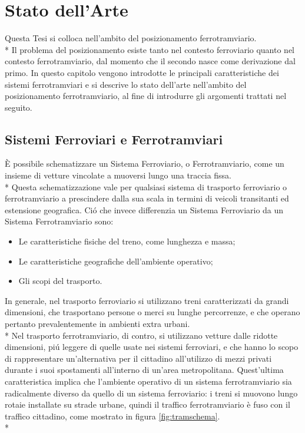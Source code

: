 \chapter{Stato dell'Arte}
Questa Tesi si colloca nell'ambito del posizionamento ferrotramviario.\\*
Il problema del posizionamento esiste tanto nel contesto ferroviario quanto nel contesto ferrotramviario, dal momento che il secondo nasce come derivazione dal primo. In questo capitolo vengono introdotte le principali caratteristiche dei sistemi ferrotramviari e si descrive lo stato dell'arte nell'ambito del posizionamento ferrotramviario, al fine di introdurre gli argomenti trattati nel seguito.
\section{Sistemi Ferroviari e Ferrotramviari}
\`E possibile schematizzare un Sistema Ferroviario, o Ferrotramviario, come un insieme di vetture vincolate a muoversi lungo una traccia fissa.\\*
Questa schematizzazione vale per qualsiasi sistema di trasporto ferroviario o ferrotramviario a prescindere dalla sua scala in termini di veicoli transitanti ed estensione geografica. Ci\'o che invece differenzia un Sistema Ferroviario da un Sistema Ferrotramviario sono:
\begin{itemize}
		\item Le caratteristiche fisiche del treno, come lunghezza e massa;
		\item Le caratteristiche geografiche dell'ambiente operativo;
		\item Gli scopi del trasporto.
\end{itemize}
In generale, nel trasporto ferroviario si utilizzano treni caratterizzati da grandi dimensioni, che trasportano persone o merci su lunghe percorrenze, e che operano pertanto prevalentemente in ambienti extra urbani. \\*
Nel trasporto ferrotramviario, di contro, si utilizzano vetture dalle ridotte dimensioni, pi\'u leggere di quelle usate nei sistemi ferroviari, e che hanno lo scopo di rappresentare un'alternativa per il cittadino all'utilizzo di mezzi privati durante i suoi spostamenti all'interno di un'area metropolitana. Quest'ultima caratteristica implica che l'ambiente operativo di un sistema ferrotramviario sia radicalmente diverso da quello di un sistema ferroviario: i treni si muovono lungo rotaie installate su strade urbane, quindi il traffico ferrotramviario \`e fuso con il traffico cittadino, come mostrato in figura \ref{fig:tramschema}.\\*
